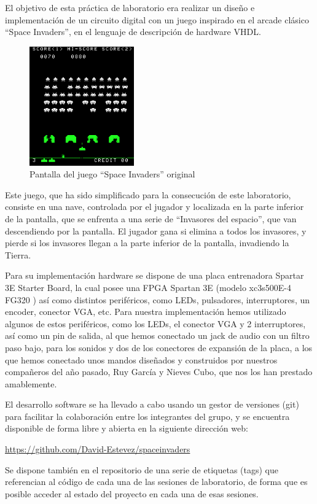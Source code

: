 \label{introduction}

El objetivo de esta práctica de laboratorio era realizar un diseño e implementación de un circuito digital con un juego inspirado en el arcade clásico ``Space Invaders'', en el lenguaje de descripción de hardware VHDL.

\begin{figure}[H]
	\centering
	\includegraphics[width=0.4\textwidth]{SpaceInvaders-Gameplay.png}
	\caption{Pantalla del juego ``Space Invaders'' original }\label{fig:originalInvaders}
\end{figure}

Este juego, que ha sido simplificado para la consecución de este laboratorio, consiste en una nave, controlada por el jugador y localizada en la parte inferior de la pantalla, que se enfrenta a una serie de ``Invasores del espacio'', que van descendiendo por la pantalla. El jugador gana si elimina a todos los invasores, y pierde si los invasores llegan a la parte inferior de la pantalla, invadiendo la Tierra.

Para su implementación hardware se dispone de una placa entrenadora Spartar 3E Starter Board, la cual posee una FPGA Spartan 3E (modelo xc3s500E-4 FG320 ) así como distintos periféricos, como LEDs, pulsadores, interruptores, un encoder, conector VGA, etc. Para nuestra implementación hemos utilizado algunos de estos periféricos, como los LEDs, el conector VGA y 2 interruptores, así como un pin de salida, al que hemos conectado un jack de audio con un filtro paso bajo, para los sonidos y dos de los conectores de expansión de la placa, a los que hemos conectado unos mandos diseñados y construidos por nuestros compañeros del año pasado, Ruy García y Nieves Cubo, que nos los han prestado amablemente.

El desarrollo software se ha llevado a cabo usando un gestor de versiones (git) para facilitar la colaboración entre los integrantes del grupo, y se encuentra disponible de forma libre y abierta en la siguiente dirección web: 
\begin{center}
\url{https://github.com/David-Estevez/spaceinvaders} \end{center}

Se dispone también en el repositorio de una serie de etiquetas (tags) que referencian al código de cada una de las sesiones de laboratorio, de forma que es posible acceder al estado del proyecto en cada una de esas sesiones.

\newpage
